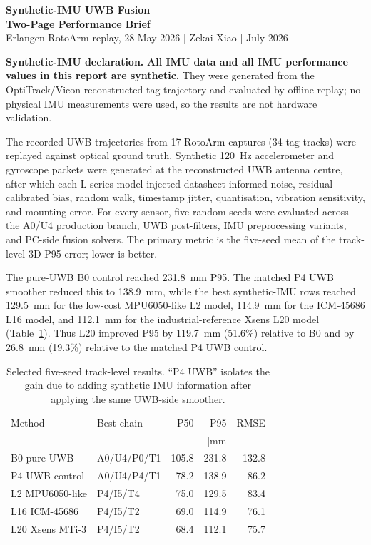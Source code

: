 \documentclass[10pt,a4paper]{article}
\newcommand{\compactsection}[1]{%
  \vspace{2pt}{\large\bfseries\color{navy}#1}\par\vspace{1pt}%
}
\begin{document}
\begin{center}
  {\LARGE\bfseries\color{navy} Synthetic-IMU UWB Fusion}\\[-1pt]
  {\large\bfseries Two-Page Performance Brief}\\[2pt]
  {\small Erlangen RotoArm replay, 28 May 2026 \quad $\vert$ \quad Zekai Xiao \quad $\vert$  July 2026}
\end{center}

\noindent\colorbox{warningbg}{%
  \parbox{\dimexpr\textwidth-2\fboxsep\relax}{%
    \textbf{\color{warningline}Synthetic-IMU declaration.}
    \textbf{All IMU data and all IMU performance values in this report are synthetic.}
    They were generated from the OptiTrack/Vicon-reconstructed tag trajectory and evaluated by offline replay; no physical IMU measurements were used, so the results are not hardware validation.
  }%
}

\compactsection{Study design}

The recorded UWB trajectories from 17 RotoArm captures (34 tag tracks) were replayed against optical ground truth. Synthetic 120~Hz accelerometer and gyroscope packets were generated at the reconstructed UWB antenna centre, after which each L-series model injected datasheet-informed noise, residual calibrated bias, random walk, timestamp jitter, quantisation, vibration sensitivity, and mounting error. For every sensor, five random seeds were evaluated across the A0/U4 production branch, UWB post-filters, IMU preprocessing variants, and PC-side fusion solvers. The primary metric is the five-seed mean of the track-level 3D P95 error; lower is better.

\compactsection{Overall fusion effect}

The pure-UWB B0 control reached 231.8~mm P95. The matched P4 UWB smoother reduced this to 138.9~mm, while the best synthetic-IMU rows reached 129.5~mm for the low-cost MPU6050-like L2 model, 114.9~mm for the ICM-45686 L16 model, and 112.1~mm for the industrial-reference Xsens L20 model (Table~\ref{tab:headline}). Thus L20 improved P95 by 119.7~mm (51.6\%) relative to B0 and by 26.8~mm (19.3\%) relative to the matched P4 UWB control.

\begin{table}[H]
\centering
\caption{Selected five-seed track-level results. ``P4 UWB'' isolates the gain due to adding synthetic IMU information after applying the same UWB-side smoother.}
\label{tab:headline}
\small
\begin{tabular}{@{}l l r r r@{}}
\toprule
Method & Best chain & P50 & P95 & RMSE \\
& & \multicolumn{3}{c}{[mm]} \\
\midrule
B0 pure UWB & A0/U4/P0/T1 & 105.8 & 231.8 & 132.8 \\
P4 UWB control & A0/U4/P4/T1 & 78.2 & 138.9 & 86.2 \\
L2 MPU6050-like & P4/I5/T4 & 75.0 & 129.5 & 83.4 \\
L16 ICM-45686 & P4/I5/T2 & 69.0 & 114.9 & 76.1 \\
L20 Xsens MTi-3 & P4/I5/T2 & 68.4 & 112.1 & 75.7 \\
\bottomrule
\end{tabular}
\end{table}
\end{document}
